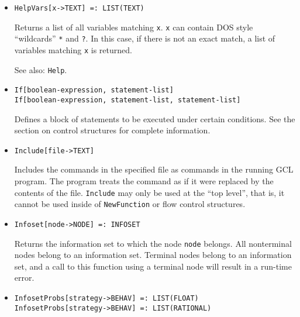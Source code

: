 \begin{itemize}
\item
\protect \large \begin{verbatim}
HelpVars[x->TEXT] =: LIST(TEXT)
\end{verbatim}\normalsize

\bd 
Returns a list of all variables matching \verb+x+.  \verb+x+ can
contain DOS style ``wildcards'' \verb+*+ and \verb+?+.  In this case,
if there is not an exact match, a list of variables matching \verb+x+
is returned.
\item
[See also:] {\tt Help}.  
\ed


\item 
\protect \large \begin{verbatim}
If[boolean-expression, statement-list]
If[boolean-expression, statement-list, statement-list]
\end{verbatim} \normalsize
  
\bd
Defines a block of statements to be executed under certain conditions.
See the section on control structures for complete information. 
\ed


\item
\protect \large \begin{verbatim}
Include[file->TEXT]
\end{verbatim}\normalsize

\bd
Includes the commands in the specified file as commands
in the running GCL program.  The program treats the command as if it
were replaced by the contents of the file.  \verb+Include+ may only be used
at the ``top level'', that is, it cannot be used inside of \verb+NewFunction+
or flow control structures.
\ed

\item
\protect \large \begin{verbatim}
Infoset[node->NODE] =: INFOSET
\end{verbatim}\normalsize

\bd
Returns the information set to which the node \verb+node+
belongs.  All nonterminal nodes belong to an information set.  Terminal
nodes belong to an information set, and a call to this function using
a terminal node will result in a run-time error.
\ed

\item
\protect \large \begin{verbatim}
InfosetProbs[strategy->BEHAV] =: LIST(FLOAT)
InfosetProbs[strategy->BEHAV] =: LIST(RATIONAL)
\end{verbatim}\normalsize


\end{itemize}
